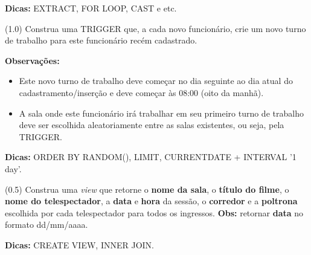 \documentclass[12pt]{exam}
\begin{document}
\begin{questions}
\textbf{Dicas:} EXTRACT, FOR LOOP, CAST e etc.

\question (1.0) Construa uma TRIGGER que, a cada novo funcionário, crie um novo turno de trabalho para este funcionário recém cadastrado.

\vspace{2px}

\textbf{Observações:}

\begin{itemize}
    \item 
    Este novo turno de trabalho deve começar no dia seguinte ao dia atual do cadastramento/inserção e deve começar às 08:00 (oito da manhã).
\item A sala onde este funcionário irá trabalhar em seu primeiro turno de trabalho deve ser escolhida aleatoriamente entre as salas existentes, ou seja, pela TRIGGER. 
\end{itemize}

\textbf{Dicas:} ORDER BY RANDOM(), LIMIT, CURRENT\underline{\hspace{0.3cm}}DATE + INTERVAL '1 day'.

\question (0.5) Construa uma \textit{view} que retorne o \textbf{nome da sala}, o \textbf{título do filme}, o \textbf{nome do telespectador}, a \textbf{data} e \textbf{hora} da sessão, o \textbf{corredor} e a \textbf{poltrona} escolhida por cada telespectador para todos os ingressos. \textbf{Obs:} retornar \textbf{data} no formato dd/mm/aaaa.



\vspace{2px}

\textbf{Dicas:} CREATE VIEW, INNER JOIN.

\end{questions}


\end{document}
